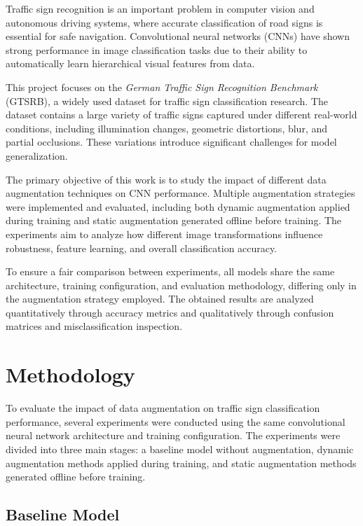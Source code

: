 \documentclass[conference]{IEEEtran}
\begin{document}
Traffic sign recognition is an important problem in computer vision and autonomous driving systems, where accurate classification of road signs is essential for safe navigation. Convolutional neural networks (CNNs) have shown strong performance in image classification tasks due to their ability to automatically learn hierarchical visual features from data.

This project focuses on the \textit{German Traffic Sign Recognition Benchmark} (GTSRB), a widely used dataset for traffic sign classification research. The dataset contains a large variety of traffic signs captured under different real-world conditions, including illumination changes, geometric distortions, blur, and partial occlusions. These variations introduce significant challenges for model generalization.

The primary objective of this work is to study the impact of different data augmentation techniques on CNN performance. Multiple augmentation strategies were implemented and evaluated, including both dynamic augmentation applied during training and static augmentation generated offline before training. The experiments aim to analyze how different image transformations influence robustness, feature learning, and overall classification accuracy.

To ensure a fair comparison between experiments, all models share the same architecture, training configuration, and evaluation methodology, differing only in the augmentation strategy employed. The obtained results are analyzed quantitatively through accuracy metrics and qualitatively through confusion matrices and misclassification inspection.



\section{Methodology}

To evaluate the impact of data augmentation on traffic sign classification performance, several experiments were conducted using the same convolutional neural network architecture and training configuration. The experiments were divided into three main stages: a baseline model without augmentation, dynamic augmentation methods applied during training, and static augmentation methods generated offline before training.

\subsection{Baseline Model}
\end{document}
